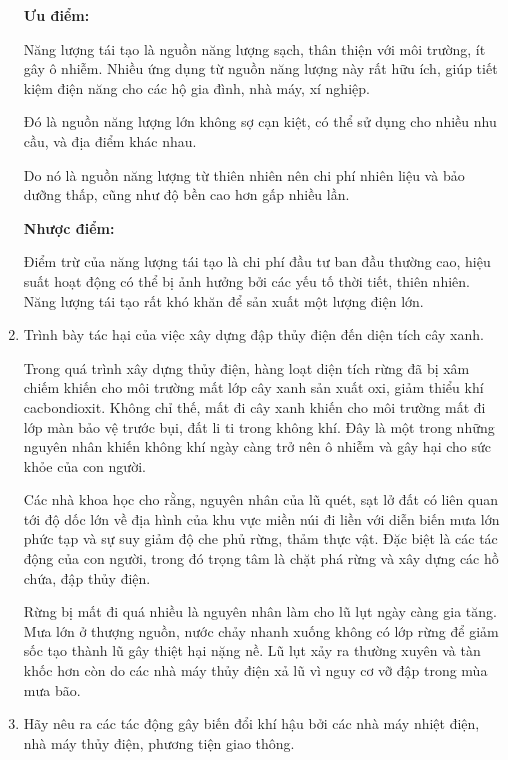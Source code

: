 \begin{enumerate}[label=\bfseries Câu \arabic*:]
	\hideall
	{
		\textbf{Ưu điểm:}
		
		Năng lượng tái tạo là nguồn năng lượng sạch, thân thiện với môi trường, ít gây ô nhiễm. Nhiều ứng dụng từ nguồn năng lượng này rất hữu ích, giúp tiết kiệm điện năng cho các hộ gia đình, nhà máy, xí nghiệp.
		
		Đó là nguồn năng lượng lớn không sợ cạn kiệt, có thể sử dụng cho nhiều nhu cầu, và địa điểm khác nhau.
		
		Do nó là nguồn năng lượng từ thiên nhiên nên chi phí nhiên liệu và bảo dưỡng thấp, cũng như độ bền cao hơn gấp nhiều lần.
		
		\textbf{Nhược điểm:}
		
		Điểm trừ của năng lượng tái tạo là chi phí đầu tư ban đầu thường cao, hiệu suất hoạt động có thể bị ảnh hưởng bởi các yếu tố thời tiết, thiên nhiên. Năng lượng tái tạo rất khó khăn để sản xuất một lượng điện lớn.
	}
	\item {}
	
	
	{
		Trình bày tác hại của việc xây dựng đập thủy điện đến diện tích cây xanh.
	}
	
	\hideall
	{
		
		Trong quá trình xây dựng thủy điện, hàng loạt diện tích rừng đã bị xâm chiếm khiến cho môi trường mất lớp cây xanh sản xuất oxi, giảm thiểu khí cacbondioxit. Không chỉ thế, mất đi cây xanh khiến cho môi trường mất đi lớp màn bảo vệ trước bụi, đất li ti trong không khí. Đây là một trong những nguyên nhân khiến không khí ngày càng trở nên ô nhiễm và gây hại cho sức khỏe của con người.
		
		Các nhà khoa học cho rằng, nguyên nhân của lũ quét, sạt lở đất có liên quan tới độ dốc lớn về địa hình của khu vực miền núi đi liền với diễn biến mưa lớn phức tạp và sự suy giảm độ che phủ rừng, thảm thực vật. Đặc biệt là các tác động của con người, trong đó trọng tâm là chặt phá rừng và xây dựng các hồ chứa, đập thủy điện.
		
		Rừng bị mất đi quá nhiều là nguyên nhân làm cho lũ lụt ngày càng gia tăng. Mưa lớn ở thượng nguồn, nước chảy nhanh xuống không có lớp rừng để giảm sốc tạo thành lũ gây thiệt hại nặng nề. Lũ lụt xảy ra thường xuyên và tàn khốc hơn còn do các nhà máy thủy điện xả lũ vì nguy cơ vỡ đập trong mùa mưa bão.
		
	}
	
	\item {}
	
	{
		Hãy nêu ra các tác động gây biến đổi khí hậu bởi các nhà máy nhiệt điện, nhà máy thủy điện, phương tiện giao thông.
	}
	

\end{enumerate}

